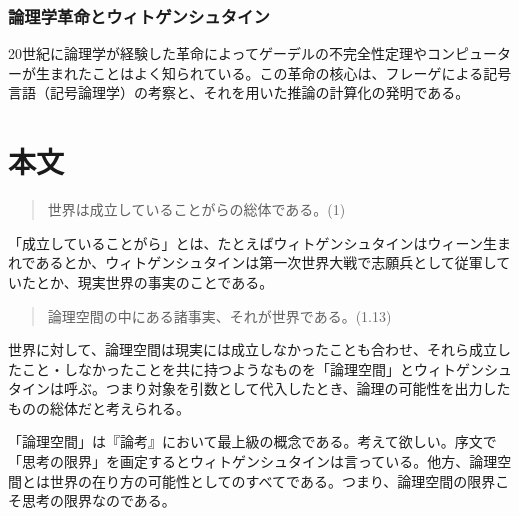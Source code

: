 \documentclass[a4paper,11pt]{jsarticle}
\begin{document}
\subsubsection{論理学革命とウィトゲンシュタイン}
20世紀に論理学が経験した革命によってゲーデルの不完全性定理やコンピューターが生まれたことはよく知られている。この革命の核心は、フレーゲによる記号言語（記号論理学）の考察と、それを用いた推論の計算化の発明である。


\section{本文}
\begin{quote}
世界は成立していることがらの総体である。(1)
\end{quote}
「成立していることがら」とは、たとえばウィトゲンシュタインはウィーン生まれであるとか、ウィトゲンシュタインは第一次世界大戦で志願兵として従軍していたとか、現実世界の事実のことである。

\begin{quote}
論理空間の中にある諸事実、それが世界である。(1.13)
\end{quote}

世界に対して、論理空間は現実には成立しなかったことも合わせ、それら成立したこと・しなかったことを共に持つようなものを「論理空間」とウィトゲンシュタインは呼ぶ。つまり対象を引数として代入したとき、論理の可能性を出力したものの総体だと考えられる。

「論理空間」は『論考』において最上級の概念である。考えて欲しい。序文で「思考の限界」を画定するとウィトゲンシュタインは言っている。他方、論理空間とは世界の在り方の可能性としてのすべてである。つまり、論理空間の限界こそ思考の限界なのである。
\end{document}
